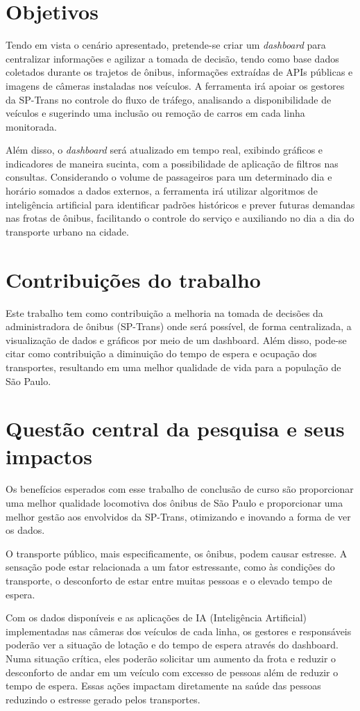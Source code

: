 \section{Objetivos}
\indent
\par Tendo em vista o cenário apresentado, pretende-se criar um \textit{dashboard} para centralizar informações e agilizar a tomada de decisão, tendo como base dados coletados durante os trajetos de ônibus, informações extraídas de APIs públicas e imagens de câmeras instaladas nos veículos. A ferramenta irá apoiar os gestores da SP-Trans no controle do fluxo de tráfego, analisando a disponibilidade de veículos e sugerindo uma inclusão ou remoção de carros em cada linha monitorada.
\par Além disso, o \textit{dashboard} será atualizado em tempo real, exibindo gráficos e indicadores de maneira sucinta, com a possibilidade de aplicação de filtros nas consultas. Considerando o volume de passageiros para um determinado dia e horário somados a dados externos, a ferramenta irá utilizar algoritmos de inteligência artificial para identificar padrões históricos e prever futuras demandas nas frotas de ônibus, facilitando o controle do serviço e auxiliando no dia a dia do transporte urbano na cidade.


\section{Contribuições do trabalho}
\indent
\par Este trabalho tem como contribuição a melhoria na tomada de decisões da administradora de ônibus (SP-Trans) onde será possível, de forma centralizada, a visualização de dados e gráficos por meio de um dashboard. Além disso, pode-se citar como contribuição a diminuição do tempo de espera e ocupação dos transportes, resultando em uma melhor qualidade de vida para a população de São Paulo.

\section{Questão central da pesquisa e seus impactos}
\indent
\par Os benefícios esperados com esse trabalho de conclusão de curso são proporcionar uma melhor qualidade locomotiva dos ônibus de São Paulo e proporcionar uma melhor gestão aos envolvidos da SP-Trans, otimizando e inovando a forma de ver os dados.

\indent
\par O transporte público, mais especificamente, os ônibus, podem causar estresse. A sensação pode estar relacionada a um fator estressante, como às condições do transporte, o desconforto de estar entre muitas pessoas e o elevado tempo de espera.
\par Com os dados disponíveis e as aplicações de IA (Inteligência Artificial) implementadas nas câmeras dos veículos de cada linha, os gestores e responsáveis poderão ver a situação de lotação e do tempo de espera através do dashboard. Numa situação crítica, eles poderão solicitar um aumento da frota e reduzir o desconforto de andar em um veículo com excesso de pessoas além de reduzir o tempo de espera. Essas ações impactam diretamente na saúde das pessoas reduzindo o estresse gerado pelos transportes.
